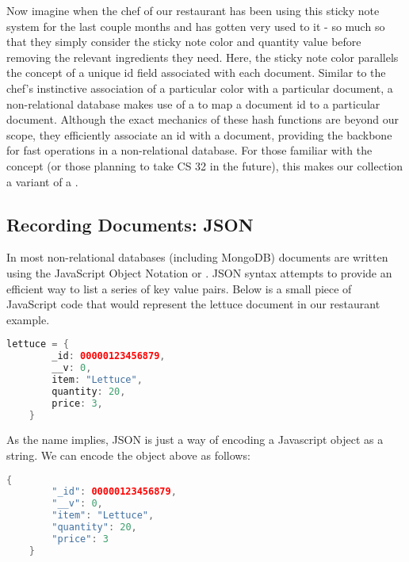 Now imagine when the chef of our restaurant has been using this sticky note system for the last couple months and has gotten very used to it - so much so that they simply consider the sticky note color and quantity value before removing the relevant ingredients they need. Here, the sticky note color parallels the concept of a unique id field associated with each document. Similar to the chef's instinctive association of a particular color with a particular document, a non-relational database makes use of a  to map a document id to a particular document. Although the exact mechanics of these hash functions are beyond our scope, they efficiently associate an id with a document, providing the backbone for fast operations in a non-relational database. For those familiar with the concept (or those planning to take CS 32 in the future), this makes our collection a variant of a .

\subsection*{Recording Documents: JSON}

In most non-relational databases (including MongoDB) documents are written using the JavaScript Object Notation or . JSON syntax attempts to provide an efficient way to list a series of key value pairs. Below is a small piece of JavaScript code that would represent the lettuce document in our restaurant example. 

\begin{lstlisting}[language=Java]
    lettuce = {
        _id: 00000123456879,
        __v: 0,
        item: "Lettuce",
        quantity: 20,
        price: 3,
    }
\end{lstlisting}

As the name implies, JSON is just a way of encoding a Javascript object as a string. We can encode the object above as follows:

\begin{lstlisting}[language=Java]
    {
        "_id": 00000123456879,
        "__v": 0,
        "item": "Lettuce",
        "quantity": 20,
        "price": 3
    }
\end{lstlisting}

